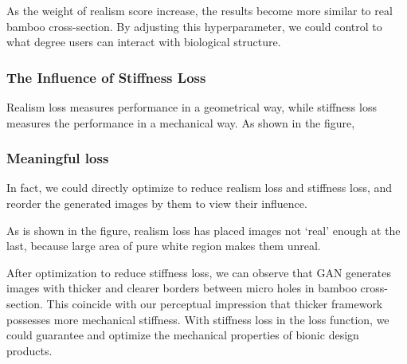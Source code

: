 As the weight of realism score increase, the results become more similar to real bamboo cross-section. By adjusting this hyperparameter, we could control to what degree users can interact with biological structure.

\subsubsection{The Influence of Stiffness Loss}
Realism loss measures performance in a geometrical way, while stiffness loss measures the performance in a mechanical way. As shown in the figure, 

\subsubsection{ Meaningful loss}

In fact, we could directly optimize to reduce realism loss and stiffness loss, and reorder the generated images by them to view their influence.

As is shown in the figure, realism loss has placed images not ‘real’ enough at the last, because large area of pure white region makes them unreal.

After optimization to reduce stiffness loss, we can observe that GAN generates images with thicker and clearer borders between micro holes in bamboo cross-section. This coincide with our perceptual impression that thicker framework possesses more mechanical stiffness. With stiffness loss in the loss function, we could guarantee and optimize the mechanical properties of bionic design products. 
